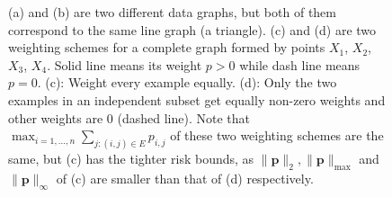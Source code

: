 \documentclass[letterpaper]{article} %
\def\SingleColumnEnd{}
\newcommand{\probdistri}{\mathbf{p}}
\newcommand{\pair}[1]{(#1)}
\begin{document}
\begin{figure}[ht]
{    }\hspace{11ex}
    \hspace{5ex}
  \SingleColumnEnd
    \caption{(a) and (b) are two different data graphs, but both of them correspond to the same line graph (a triangle). 
    (c) and (d) are two weighting schemes for a complete graph formed by points $X_1$, $X_2$, $X_3$, $X_4$. Solid line means its weight $p>0$ while dash line means $p=0$. (c): Weight every example equally. (d): Only the two examples in an independent subset get equally non-zero weights and other weights are $0$ (dashed line). Note that $\max_{i=1,\dots,n} \sum_{j:\pair{i,j}\in E} p_{i,j}$ of these two weighting schemes are the same, but (c) has the tighter risk bounds, as $\|\probdistri{}\|_2, \|\probdistri{}\|_\max$ and $\|\probdistri{}\|_\infty$ of (c) are smaller than that of (d) respectively.}
    \label{fig:weighting_scheme_complete_graph}
\end{figure}

\end{document}
